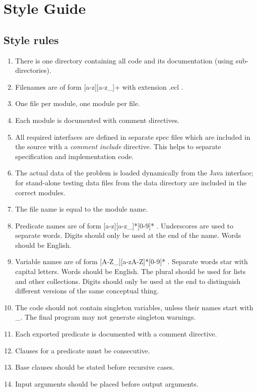 \documentclass[a4paper,12pt]{report}
\begin{document}
\chapter{Style Guide}
\label{styleguide}

\section{Style rules}
\begin{enumerate}
\item   There is one directory containing all code and its documentation (using sub-directories).
\item  Filenames are of form [a-z][a-z\_]+ with extension .ecl .
\item  One file per module, one module per file.
\item  Each module is documented with comment directives.
\item  All required interfaces are defined in separate spec files which are included in the source with a {\it comment include} directive. This helps to separate specification and implementation code.
\item  The actual data of the problem is loaded dynamically from the Java interface; for stand-alone testing data files from the data directory are included in the correct modules.
\item  The file name is equal to the module name.
\item  Predicate names are of form [a-z][a-z\_]*[0-9]* . Underscores are used to separate words. Digits should only be used at the end of the name. Words should be English.
\item  Variable names are of form [A-Z\_][a-zA-Z]*[0-9]* . Separate words star with capital letters. Words should be English. The plural should be used for lists and other collections. Digits should only be used at the end to distinguish different versions of the same conceptual thing.
\item  The code should not contain singleton variables, unless their names start with \_. The final program may not generate singleton warnings.
\item  Each exported predicate is documented with a comment directive.
\item  Clauses for a predicate must be consecutive.
\item  Base clauses should be stated before recursive cases.
\item  Input arguments should be placed before output arguments.

\end{enumerate}
\end{document}
